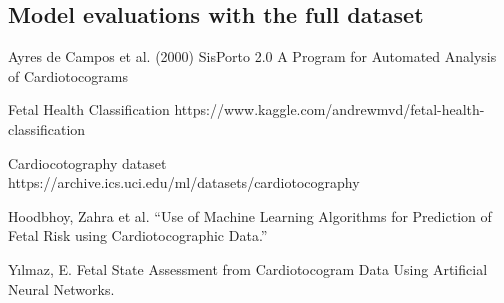 \documentclass[a4paper,12pt]{article}
\begin{document}
\subsection{Model evaluations with the full dataset}
\begin{thebibliography}{9}
Ayres de Campos et al. (2000) SisPorto 2.0 A Program for Automated Analysis of Cardiotocograms

Fetal Health Classification https://www.kaggle.com/andrewmvd/fetal-health-classification

Cardiocotography dataset https://archive.ics.uci.edu/ml/datasets/cardiotocography

Hoodbhoy, Zahra et al. “Use of Machine Learning Algorithms for Prediction of Fetal Risk using Cardiotocographic Data.”

Yılmaz, E. Fetal State Assessment from Cardiotocogram Data Using Artificial Neural Networks.

\end{thebibliography}
\end{document}
